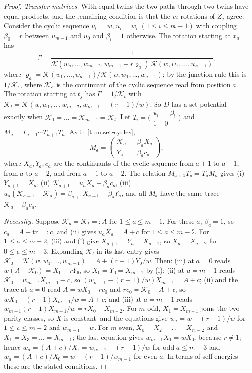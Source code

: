 \documentclass[11pt]{amsart}
\theoremstyle{plain}
\theoremstyle{definition}
\theoremstyle{remark}
\numberwithin{equation}{section}
\newcommand{\cont}{\mathcal{K}}           %
\begin{document}
\begin{proof}
\emph{Transfer matrices.} With equal twins the two paths through two twins have equal products, and the remaining condition is that the $m$ rotations of $Z_j$ agree. Consider the cyclic sequence $u_0=w$, $u_i=w_i$ $(1\le i\le m-1)$ with coupling $\beta_0=r$ between $u_{m-1}$ and $u_0$ and $\beta_i=1$ otherwise. The rotation starting at $x_a$ has
\[
\Gamma=\frac{1}{\cont(w_a,\dots,w_{m-2},w_{m-1}-r\varrho_a)\,\cont(w,w_1,\dots,w_{a-1})},
\]
where $\varrho_a=\cont(w_1,\dots,w_{a-1})/\cont(w,w_1,\dots,w_{a-1})$; by the junction rule this is $1/\cont_a$, where $\cont_a$ is the continuant of the cyclic sequence read from position $a$. The rotation starting at $t_j$ has $\Gamma=1/\cont_t$ with $\cont_t=\cont(w,w_1,\dots,w_{m-2},w_{m-1}-(r-1)/w)$. So $D$ has a set potential exactly when $\cont_1=\dots=\cont_{m-1}=\cont_t$. Let $T_i=\bigl(\begin{smallmatrix}u_i&-\beta_i\\1&0\end{smallmatrix}\bigr)$ and $M_a=T_{a-1}\cdots T_{a+1}T_a$. As in \cref{thm:set-cycles},
\[
M_a=\begin{pmatrix}\cont_a&-\beta_aX_a\\Y_a&-\beta_ac_a\end{pmatrix},
\]
where $X_a,Y_a,c_a$ are the continuants of the cyclic sequence from $a+1$ to $a-1$, from $a$ to $a-2$, and from $a+1$ to $a-2$. The relation $M_{a+1}T_a=T_aM_a$ gives (i) $Y_{a+1}=X_a$, (ii) $\cont_{a+1}=u_aX_a-\beta_ac_a$, (iii) $u_a(\cont_{a+1}-\cont_a)=\beta_{a+1}X_{a+1}-\beta_aY_a$, and all $M_a$ have the same trace $\cont_a-\beta_ac_a$.

\emph{Necessity.} Suppose $\cont_a=\cont_t=:A$ for $1\le a\le m-1$. For these $a$, $\beta_a=1$, so $c_a=A-\mathrm{tr}=:c$, and (ii) gives $u_aX_a=A+c$ for $1\le a\le m-2$. For $1\le a\le m-2$, (iii) and (i) give $X_{a+1}=Y_a=X_{a-1}$, so $X_a=X_{a+2}$ for $0\le a\le m-3$. Expanding $\cont_t$ in its last entry gives $\cont_0=\cont(w,w_1,\dots,w_{m-1})=A+(r-1)Y_0/w$. Then: (iii) at $a=0$ reads $w(A-\cont_0)=X_1-rY_0$, so $X_1=Y_0=X_{m-1}$ by (i); (ii) at $a=m-1$ reads $\cont_0=w_{m-1}X_{m-1}-c$, so $(w_{m-1}-(r-1)/w)X_{m-1}=A+c$; (ii) and the trace at $a=0$ read $A=wX_0-rc_0$ and $rc_0=\cont_0-A+c$, so $wX_0-(r-1)X_{m-1}/w=A+c$; and (iii) at $a=m-1$ reads $w_{m-1}(r-1)X_{m-1}/w=rX_0-X_{m-2}$. For $m$ odd, $X_1=X_{m-1}$ joins the two parity classes, so $X$ is constant, and the equations give $w_a=w-(r-1)/w$ for $1\le a\le m-2$ and $w_{m-1}=w$. For $m$ even, $X_0=X_2=\dots=X_{m-2}$ and $X_1=X_3=\dots=X_{m-1}$; the last equation gives $w_{m-1}X_1=wX_0$, because $r\neq1$; hence $w_a=(A+c)/X_1=w_{m-1}-(r-1)/w$ for odd $a\le m-3$ and $w_a=(A+c)/X_0=w-(r-1)/w_{m-1}$ for even $a$. In terms of self-energies these are the stated conditions.


\end{proof}
\end{document}
